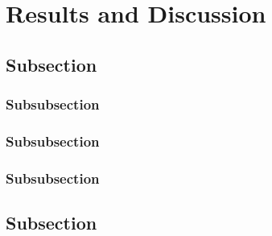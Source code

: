 \documentclass[fleqn,10pt]{SelfArx} %
\begin{document}
\lipsum[9] %



\section{Results and Discussion}

\lipsum[10] %

\subsection{Subsection}

\lipsum[11] %

\subsubsection{Subsubsection}

\lipsum[12] %

\subsubsection{Subsubsection}

\lipsum[13] %


\subsubsection{Subsubsection}

\lipsum[14] %

\subsection{Subsection}

\lipsum[15] %

\newpage




\end{document}
